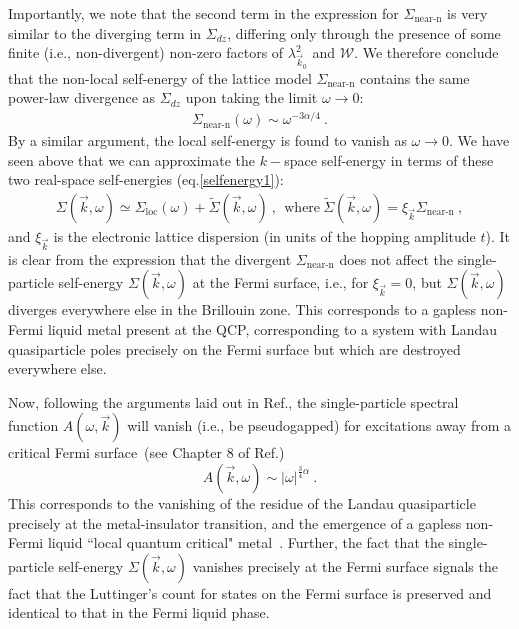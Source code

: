 \documentclass[prb]{revtex4-2}
\begin{document}
Importantly, we note that the second term in the expression for \(\Sigma_\text{near-n}\) is very similar to the diverging term in \(\Sigma_{dz}\), differing only through the presence of some finite (i.e., non-divergent) non-zero factors of \(\lambda_{\vec k_0}^2\) and \(\mathcal{W}\). We therefore conclude that the non-local self-energy of the lattice model $\Sigma_\text{near-n}$ contains the same power-law divergence  as $\Sigma_{dz}$ upon taking the limit $\omega\to 0$:
\begin{equation}\begin{aligned}
	\Sigma_\text{near-n}\left( \omega \right) \sim \omega^{-3\alpha/4}~.
\end{aligned}\end{equation}
By a similar argument, the local self-energy is found to vanish as \(\omega \to 0\). We have seen above that we can approximate the \(k-\)space self-energy in terms of these two real-space self-energies (eq.\eqref{selfenergy1}):
\begin{equation}\begin{aligned}
	\Sigma(\vec k, \omega) \simeq \Sigma_\text{loc}(\omega) + \tilde{\Sigma}(\vec k, \omega)~,~~\textrm{where}~\tilde{\Sigma}(\vec k, \omega)=\xi_{\vec k}\Sigma_\text{near-n}~,
\end{aligned}\end{equation}
and $\xi_{\vec{k}}$ is the electronic lattice dispersion (in units of the hopping amplitude $t$). It is clear from the expression that the divergent $\Sigma_\text{near-n}$ does not affect the single-particle self-energy $\Sigma(\vec k,\omega)$ at the Fermi surface, i.e., for $\xi_{\vec{k}}= 0$, but $\Sigma(\vec k,\omega)$ diverges everywhere else in the Brillouin zone. This corresponds to a gapless non-Fermi liquid metal present at the QCP, corresponding to a system with Landau quasiparticle poles precisely on the Fermi surface but which are destroyed everywhere else.

Now, following the arguments laid out in Ref.\cite{sujan2023}, the single-particle spectral function $A(\omega,\vec{k})$ will vanish (i.e., be pseudogapped) for excitations away from a critical Fermi surface~(see Chapter 8 of Ref.\cite{carr2010})
\begin{equation}
A(\vec{k},\omega) \sim |\omega|^{\frac{3}{4}\alpha}~.
\end{equation}	
This corresponds to the vanishing of the residue of the Landau quasiparticle precisely at the metal-insulator transition, and the emergence of a gapless non-Fermi liquid ``local quantum critical" metal~\cite{Si2001}. Further, the fact that the single-particle self-energy $\Sigma(\vec k, \omega)$ vanishes precisely at the Fermi surface signals the fact that the Luttinger's count for states on the Fermi surface is preserved and identical to that in the Fermi liquid phase. 
\end{document}
